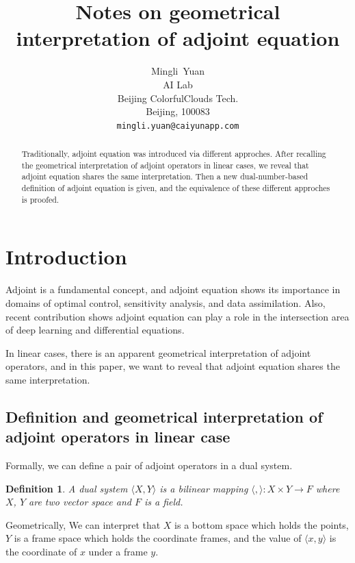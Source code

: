 \documentclass{article}
\title{Notes on geometrical interpretation of adjoint equation}
\author{
  Mingli~Yuan \\
  AI Lab \\
  Beijing ColorfulClouds Tech.\\
  Beijing, 100083 \\
  \texttt{mingli.yuan@caiyunapp.com} \\
}
\newtheorem{definition}{Definition}
\begin{document}
\maketitle

\begin{abstract}
Traditionally, adjoint equation was introduced via different approches.
After recalling the geometrical interpretation of adjoint operators in linear cases, we reveal that adjoint equation shares the same interpretation.
Then a new dual-number-based definition of adjoint equation is given, and the equivalence of these different approches is proofed.
\end{abstract}


\section{Introduction}

Adjoint is a fundamental concept\cite{Daz1953MethodsOM}\cite{Marchuk1995}, and adjoint equation shows its importance in domains of optimal control\cite{Liberzon2012CalculusOV}, sensitivity analysis\cite{hall1983physical}, and data assimilation\cite{Errico1997WhatIA}. Also, recent contribution\cite{Chen2018NeuralOD} shows adjoint equation can play a role in the intersection area of deep learning and differential equations.

In linear cases, there is an apparent geometrical interpretation of adjoint operators, and in this paper, we want to reveal that adjoint equation shares the same interpretation.

\subsection{Definition and geometrical interpretation of adjoint operators in linear case}

Formally, we can define a pair of adjoint operators in a dual system.

\begin{definition}
\label{d0}
A dual system $ \langle X, Y \rangle $ is a bilinear mapping $ \langle , \rangle : X \times Y \to F $ where $X$, $Y$ are two vector space and $ F $ is a field.
\end{definition}

Geometrically, We can interpret that $ X $ is a bottom space which holds the points, $ Y $ is a frame space which holds the coordinate frames, and the value of $ \langle x, y \rangle $ is the coordinate of $x$ under a frame $y$.
\end{document}
